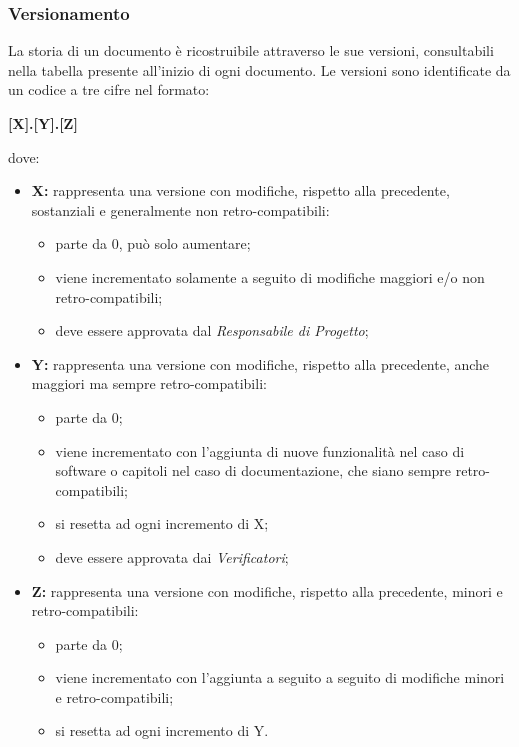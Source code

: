 \subsubsection{Versionamento}
La storia di un documento è ricostruibile attraverso le sue versioni, consultabili nella tabella presente all'inizio di ogni documento. Le versioni sono identificate da un codice a tre cifre nel formato:
\begin{center}
    \textbf{\large [X].[Y].[Z]}\\
\end{center}
dove:
\begin{itemize}
    \item \textbf{\large X:} rappresenta una versione con modifiche, rispetto alla precedente, sostanziali e generalmente non retro-compatibili:
          \begin{itemize}
              \item parte da 0, può solo aumentare;
              \item viene incrementato solamente a seguito di modifiche maggiori e/o non retro-compatibili;
              \item deve essere approvata dal \textit{Responsabile di Progetto};
          \end{itemize}
    \item \textbf{\large Y:} rappresenta una versione con modifiche, rispetto alla precedente, anche maggiori ma sempre retro-compatibili:
          \begin{itemize}
              \item parte da 0;
              \item viene incrementato con l'aggiunta di nuove funzionalità nel caso di software o capitoli nel caso di documentazione, che siano sempre retro-compatibili;
              \item si resetta ad ogni incremento di X;
              \item deve essere approvata dai \textit{Verificatori};
          \end{itemize}
    \item \textbf{\large Z:} rappresenta una versione con modifiche, rispetto alla precedente, minori e retro-compatibili:
          \begin{itemize}
              \item parte da 0;
              \item viene incrementato con l'aggiunta a seguito a seguito di modifiche minori e retro-compatibili;
              \item si resetta ad ogni incremento di Y.
          \end{itemize}
\end{itemize}
